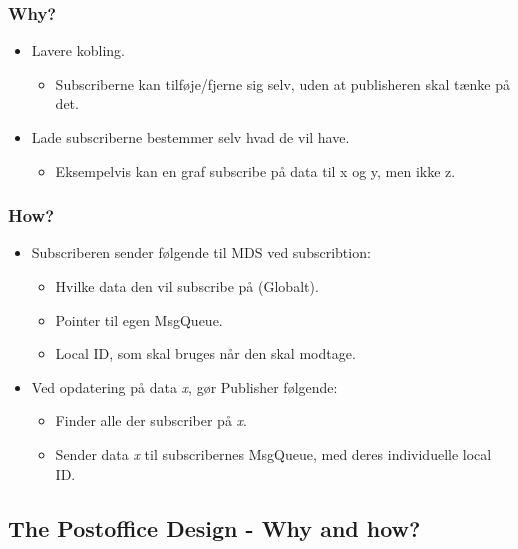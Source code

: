 \subsubsection{Why?}
\begin{itemize}
	\item Lavere kobling.
	\begin{itemize}
		\item Subscriberne kan tilføje/fjerne sig selv, uden at publisheren skal tænke på det.
	\end{itemize}
	\item Lade subscriberne bestemmer selv hvad de vil have.
	\begin{itemize}
		\item Eksempelvis kan en graf subscribe på data til x og y, men ikke z.
	\end{itemize}
\end{itemize}

\subsubsection{How?}
\begin{itemize}
	\item Subscriberen sender følgende til MDS ved subscribtion:
	\begin{itemize}
		\item Hvilke data den vil subscribe på (Globalt).
		\item Pointer til egen MsgQueue.
		\item Local ID, som skal bruges når den skal modtage. 
	\end{itemize}
	\item Ved opdatering på data \textit{x}, gør Publisher følgende:
	\begin{itemize}
		\item Finder alle der subscriber på \textit{x}.
		\item Sender data \textit{x} til subscribernes MsgQueue, med deres individuelle local ID.
	\end{itemize}
\end{itemize}


\subsection{The Postoffice Design - Why and how?}

